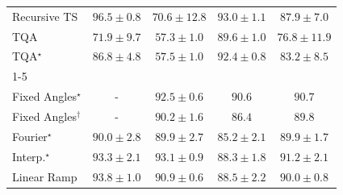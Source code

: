 \begin{tabular}{l|cccc|}
Recursive TS & {\cellcolor[HTML]{6E2706}} \color[HTML]{F1F1F1} $96.5\pm 0.8$ & {\cellcolor[HTML]{FEBA46}} \color[HTML]{000000} $70.6\pm 12.8$ & {\cellcolor[HTML]{8C3004}} \color[HTML]{F1F1F1} $93.0\pm 1.1$ & {\cellcolor[HTML]{BB4403}} \color[HTML]{F1F1F1} $87.9\pm 7.0$ \\
TQA & {\cellcolor[HTML]{FEAF3D}} \color[HTML]{000000} $71.9\pm 9.7$ & {\cellcolor[HTML]{FFF8C1}} \color[HTML]{000000} $57.3\pm 1.0$ & {\cellcolor[HTML]{AC3D03}} \color[HTML]{F1F1F1} $89.6\pm 1.0$ & {\cellcolor[HTML]{F88A21}} \color[HTML]{F1F1F1} $76.8\pm 11.9$ \\
TQA$^\star$ & {\cellcolor[HTML]{C64902}} \color[HTML]{F1F1F1} $86.8\pm 4.8$ & {\cellcolor[HTML]{FFF8C0}} \color[HTML]{000000} $57.5\pm 1.0$ & {\cellcolor[HTML]{933204}} \color[HTML]{F1F1F1} $92.4\pm 0.8$ & {\cellcolor[HTML]{DC5E0B}} \color[HTML]{F1F1F1} $83.2\pm 8.5$ \\
\cline{1-5}
\multicolumn{5}{c}{\rule{0pt}{8pt}PP} \\
\midrule
Fixed Angles$^\star$ & {\cellcolor[HTML]{000000}} \color[HTML]{F1F1F1} {\cellcolor{white}} \color{black} - & {\cellcolor[HTML]{006335}} \color[HTML]{F1F1F1} $92.5\pm 0.6$ & {\cellcolor[HTML]{076D39}} \color[HTML]{F1F1F1} $90.6$ & {\cellcolor[HTML]{076D39}} \color[HTML]{F1F1F1} $90.7$ \\
Fixed Angles$^\dagger$ & {\cellcolor[HTML]{000000}} \color[HTML]{F1F1F1} {\cellcolor{white}} \color{black} - & {\cellcolor[HTML]{096F3A}} \color[HTML]{F1F1F1} $90.2\pm 1.6$ & {\cellcolor[HTML]{218242}} \color[HTML]{F1F1F1} $86.4$ & {\cellcolor[HTML]{0C723B}} \color[HTML]{F1F1F1} $89.8$ \\
Fourier$^\star$ & {\cellcolor[HTML]{0B713B}} \color[HTML]{F1F1F1} $90.0\pm 2.8$ & {\cellcolor[HTML]{0B713B}} \color[HTML]{F1F1F1} $89.9\pm 2.7$ & {\cellcolor[HTML]{288A47}} \color[HTML]{F1F1F1} $85.2\pm 2.1$ & {\cellcolor[HTML]{0B713B}} \color[HTML]{F1F1F1} $89.9\pm 1.7$ \\
Interp.$^\star$ & {\cellcolor[HTML]{005E33}} \color[HTML]{F1F1F1} $93.3\pm 2.1$ & {\cellcolor[HTML]{005F34}} \color[HTML]{F1F1F1} $93.1\pm 0.9$ & {\cellcolor[HTML]{15793E}} \color[HTML]{F1F1F1} $88.3\pm 1.8$ & {\cellcolor[HTML]{036B38}} \color[HTML]{F1F1F1} $91.2\pm 2.1$ \\
Linear Ramp & {\cellcolor[HTML]{005B32}} \color[HTML]{F1F1F1} $93.8\pm 1.0$ & {\cellcolor[HTML]{056C39}} \color[HTML]{F1F1F1} $90.9\pm 0.6$ & {\cellcolor[HTML]{14783E}} \color[HTML]{F1F1F1} $88.5\pm 2.2$ & {\cellcolor[HTML]{0B713B}} \color[HTML]{F1F1F1} $90.0\pm 0.8$ \\

\end{tabular}
